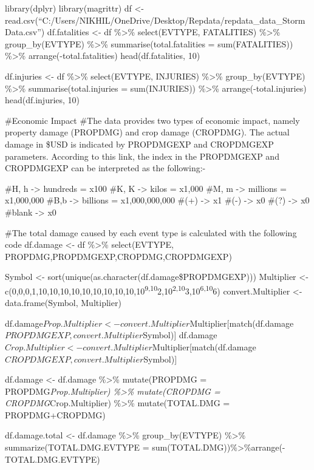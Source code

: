 \documentclass[
]{article}
\author{}
\date{\vspace{-2.5em}}
\begin{document}
library(dplyr) library(magrittr) df \textless-
read.csv(``C:/Users/NIKHIL/OneDrive/Desktop/Repdata/repdata\_data\_StormData.csv'')
df.fatalities \textless- df \%\textgreater\% select(EVTYPE, FATALITIES)
\%\textgreater\% group\_by(EVTYPE) \%\textgreater\%
summarise(total.fatalities = sum(FATALITIES)) \%\textgreater\%
arrange(-total.fatalities) head(df.fatalities, 10)

df.injuries \textless- df \%\textgreater\% select(EVTYPE, INJURIES)
\%\textgreater\% group\_by(EVTYPE) \%\textgreater\%
summarise(total.injuries = sum(INJURIES)) \%\textgreater\%
arrange(-total.injuries) head(df.injuries, 10)

\#Economic Impact \#The data provides two types of economic impact,
namely property damage (PROPDMG) and crop damage (CROPDMG). The actual
damage in \$USD is indicated by PROPDMGEXP and CROPDMGEXP parameters.
According to this link, the index in the PROPDMGEXP and CROPDMGEXP can
be interpreted as the following:-

\#H, h -\textgreater{} hundreds = x100 \#K, K -\textgreater{} kilos =
x1,000 \#M, m -\textgreater{} millions = x1,000,000 \#B,b
-\textgreater{} billions = x1,000,000,000 \#(+) -\textgreater{} x1 \#(-)
-\textgreater{} x0 \#(?) -\textgreater{} x0 \#blank -\textgreater{} x0

\#The total damage caused by each event type is calculated with the
following code df.damage \textless- df \%\textgreater\% select(EVTYPE,
PROPDMG,PROPDMGEXP,CROPDMG,CROPDMGEXP)

Symbol \textless- sort(unique(as.character(df.damage\$PROPDMGEXP)))
Multiplier \textless-
c(0,0,0,1,10,10,10,10,10,10,10,10,10,10\textsuperscript{9,10}2,10\textsuperscript{2,10}3,10\textsuperscript{6,10}6)
convert.Multiplier \textless- data.frame(Symbol, Multiplier)

df.damage\(Prop.Multiplier <- convert.Multiplier\)Multiplier{[}match(df.damage\(PROPDMGEXP, convert.Multiplier\)Symbol){]}
df.damage\(Crop.Multiplier <- convert.Multiplier\)Multiplier{[}match(df.damage\(CROPDMGEXP, convert.Multiplier\)Symbol){]}

df.damage \textless- df.damage \%\textgreater\% mutate(PROPDMG =
PROPDMG\emph{Prop.Multiplier) \%\textgreater\% mutate(CROPDMG =
CROPDMG}Crop.Multiplier) \%\textgreater\% mutate(TOTAL.DMG =
PROPDMG+CROPDMG)

df.damage.total \textless- df.damage \%\textgreater\% group\_by(EVTYPE)
\%\textgreater\% summarize(TOTAL.DMG.EVTYPE =
sum(TOTAL.DMG))\%\textgreater\%arrange(-TOTAL.DMG.EVTYPE)
\end{document}

